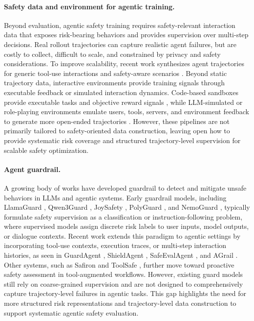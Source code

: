 \paragraph{Safety data and environment for agentic training.} 
Beyond evaluation, agentic safety training requires safety-relevant interaction data that exposes risk-bearing behaviors and provides supervision over multi-step decisions. Real rollout trajectories can capture realistic agent failures, but are costly to collect, difficult to scale, and constrained by privacy and safety considerations. To improve scalability, recent work synthesizes agent trajectories for generic tool-use interactions \citep{li2025domain,toolace2025,kimi2025,auragen2025} and safety-aware scenarios \citep{xie-etal-2025-toolsafety,zhang2025agentalign,mou2026toolsafe}. Beyond static trajectory data, interactive environments provide training signals through executable feedback or simulated interaction dynamics. Code-based sandboxes provide executable tasks and objective reward signals \citep{wang2026agent,song2026envscaler,gao2026self,guo2025genenv}, while LLM-simulated or role-playing environments emulate users, tools, servers, and environment feedback to generate more open-ended trajectories \citep{li2025close,chen2025scaling,li2025simulating}. However, these pipelines are not primarily tailored to safety-oriented data construction, leaving open how to provide systematic risk coverage and structured trajectory-level supervision for scalable safety optimization.


\paragraph{Agent guardrail.} A growing body of works have developed guardrail to detect and mitigate unsafe behaviors in LLMs and agentic systems. Early guardrail models, including LlamaGuard \citep{inan2023llama}, Qwen3Guard \citep{qwen3guard2025}, JoySafety \citep{jd-opensource2025}, PolyGuard \citep{poliguard2025}, and NemoGuard \citep{nemo_guardrails2023}, typically formulate safety supervision as a classification or instruction-following problem, where supervised models assign discrete risk labels to user inputs, model outputs, or dialogue contexts. Recent work extends this paradigm to agentic settings by incorporating tool-use contexts, execution traces, or multi-step interaction histories, as seen in GuardAgent \citep{xiang2024guardagent}, ShieldAgent \citep{shieldagent2025}, SafeEvalAgent \citep{Wang2025safeevalagent}, and AGrail \citep{Luo2025agrail}. Other systems, such as Safiron \citep{huang2025building} and ToolSafe \citep{mou2026toolsafe}, further move toward proactive safety assessment in tool-augmented workflows. However, existing guard models still rely on coarse-grained supervision and are not designed to comprehensively capture trajectory-level failures in agentic tasks. This gap highlights the need for more structured risk representations and trajectory-level data construction to support systematic agentic safety evaluation.
